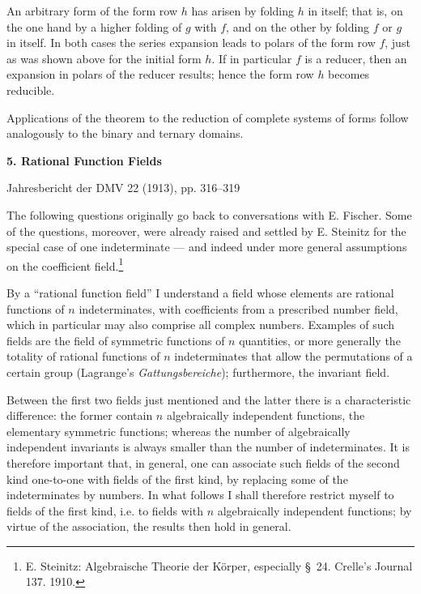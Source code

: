 \documentclass[11pt]{article}
\begin{document}
An arbitrary form of the form row $h$ has arisen by folding $h$ in itself; that is, on the one hand by a higher folding of $g$ with $f$, and on the other by folding $f$ or $g$ in itself. In both cases the series expansion leads to polars of the form row $f$, just as was shown above for the initial form $h$. If in particular $f$ is a reducer, then an expansion in polars of the reducer results; hence the form row $h$ becomes reducible.

Applications of the theorem to the reduction of complete systems of forms follow analogously to the binary and ternary domains.


\clearpage
\providecommand{\Kfield}{\mathfrak{K}}
\providecommand{\Ssys}{\mathfrak{S}}
\providecommand{\Mfield}{\mathfrak{M}}
\providecommand{\tq}{\tau}
\providecommand{\ds}{\displaystyle}

\begin{center}
{\Large\bfseries 5. Rational Function Fields}\par
\vspace{1.2em}
Jahresbericht der DMV 22 (1913), pp. 316--319
\end{center}

\vspace{2em}

The following questions originally go back to conversations with E. Fischer. Some of the questions, moreover, were already raised and settled by E. Steinitz for the special case of one indeterminate --- and indeed under more general assumptions on the coefficient field.\footnote{E. Steinitz: Algebraische Theorie der Körper, especially \S\ 24. Crelle's Journal 137. 1910.}

By a ``rational function field'' I understand a field whose elements are rational functions of $n$ indeterminates, with coefficients from a prescribed number field, which in particular may also comprise all complex numbers. Examples of such fields are the field of symmetric functions of $n$ quantities, or more generally the totality of rational functions of $n$ indeterminates that allow the permutations of a certain group (Lagrange's \emph{Gattungsbereiche}); furthermore, the invariant field.

Between the first two fields just mentioned and the latter there is a characteristic difference: the former contain $n$ algebraically independent functions, the elementary symmetric functions; whereas the number of algebraically independent invariants is always smaller than the number of indeterminates. It is therefore important that, in general, one can associate such fields of the second kind one-to-one with fields of the first kind, by replacing some of the indeterminates by numbers. In what follows I shall therefore restrict myself to fields of the first kind, i.e. to fields with $n$ algebraically independent functions; by virtue of the association, the results then hold in general.
\end{document}
